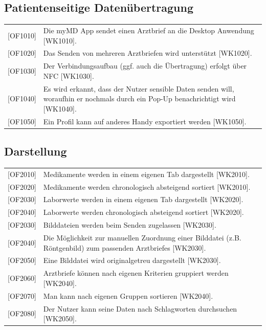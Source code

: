 \documentclass[a4paper]{scrreprt}
\begin{document}
\subsection{Patientenseitige Datenübertragung}
\begin{tabular}{lll}
[OF1010]&  \multicolumn{2}{p{12cm}}{Die myMD \gls{App} sendet einen Arztbrief an die \gls{Desktop Anwendung} [WK1010].}\\
{[OF1020]} &  \multicolumn{2}{p{12cm}}{Das Senden von mehreren Arztbriefen wird unterstützt [WK1020].}  \\
{[OF1030]} &  \multicolumn{2}{p{12cm}}{Der Verbindungsaufbau (ggf. auch die Übertragung) erfolgt über \gls{NFC} [WK1030].}  \\
{[OF1040]} &  \multicolumn{2}{p{12cm}}{Es wird erkannt, dass der Nutzer sensible Daten senden will, woraufhin er nochmals durch ein Pop-Up benachrichtigt wird [WK1040].}  \\
{[OF1050]} &  \multicolumn{2}{p{12cm}}{Ein Profil kann auf anderes Handy exportiert werden [WK1050].}  \\

\end{tabular}

\subsection{Darstellung}
\begin{tabular}{lll}
[OF2010]&  \multicolumn{2}{p{12cm}}{Medikamente werden in einem eigenen Tab dargestellt [WK2010].}\\
{[OF2020]}&  \multicolumn{2}{p{12cm}}{Medikamente werden chronologisch absteigend sortiert [WK2010].}\\
{[OF2030]}&  \multicolumn{2}{p{12cm}}{Laborwerte werden in einem eigenen Tab dargestellt [WK2020].}\\
{[OF2040]}&  \multicolumn{2}{p{12cm}}{Laborwerte werden chronologisch absteigend sortiert [WK2020].}\\
{[OF2030]} &  \multicolumn{2}{p{12cm}}{Bilddateien werden beim Senden zugelassen [WK2030].}  \\
{[OF2040]} &  \multicolumn{2}{p{12cm}}{Die Möglichkeit zur manuellen Zuordnung einer Bilddatei (z.B. Röntgenbild) zum passenden Arztbriefes [WK2030].}  \\
{[OF2050]} &  \multicolumn{2}{p{12cm}}{Eine Bilddatei wird originalgetreu dargestellt [WK2030].}  \\
{[OF2060]} &  \multicolumn{2}{p{12cm}}{Arztbriefe können nach eigenen Kriterien gruppiert werden [WK2040].}  \\
{[OF2070]} &  \multicolumn{2}{p{12cm}}{Man kann nach eigenen Gruppen sortieren [WK2040].}  \\
{[OF2080]} &  \multicolumn{2}{p{12cm}}{Der Nutzer kann seine Daten nach Schlagworten durchsuchen [WK2050].}  \\


\end{tabular}
\end{document}
